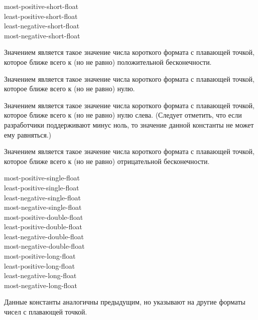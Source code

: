 \begin{defun}[Константа]
most-positive-short-float \\
least-positive-short-float \\
least-negative-short-float \\
most-negative-short-float

Значением  является такое значение числа
короткого формата с плавающей точкой, которое ближе всего к (но не равно)
положительной бесконечности. 

Значением  является такое значение числа
короткого формата с плавающей точкой, которое ближе всего к (но не равно) нулю. 

Значением  является такое значение числа
короткого формата с плавающей точкой, которое ближе всего к (но не равно) нулю
слева. (Следует отметить, что если разработчики поддерживают минус ноль, то
значение данной константы не может ему равняться.) 

Значением  является такое значение числа
короткого формата с плавающей точкой, которое ближе всего к (но не равно)
отрицательной бесконечности. 
\end{defun}

\begin{defun}[Константа]
most-positive-single-float \\
least-positive-single-float \\
least-negative-single-float \\
most-negative-single-float \\
most-positive-double-float \\
least-positive-double-float \\
least-negative-double-float \\
most-negative-double-float \\
most-positive-long-float \\
least-positive-long-float \\
least-negative-long-float \\
most-negative-long-float

Данные константы аналогичны предыдущим, но указывают на другие форматы чисел с
плавающей точкой.
\end{defun}

\bigskip


